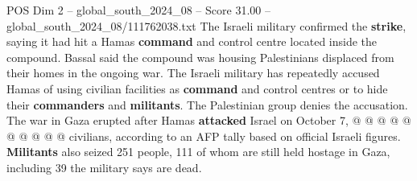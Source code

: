 \begin{textsample}{POS Dim 2 – global\_south\_2024\_08 – Score 31.00 – global\_south\_2024\_08/111762038.txt}
The Israeli military confirmed the \textbf{strike}, saying it had hit a Hamas \textbf{command} and control centre located inside the compound.
Bassal said the compound was housing Palestinians displaced from their homes in the ongoing war.
The Israeli military has repeatedly accused Hamas of using civilian facilities as \textbf{command} and control centres or to hide their \textbf{commanders} and \textbf{militants}.
The Palestinian group denies the accusation.
The war in Gaza erupted after Hamas \textbf{attacked} Israel on October 7, @ @ @ @ @ @ @ @ @ @ civilians, according to an AFP tally based on official Israeli figures. \textbf{Militants} also seized 251 people, 111 of whom are still held hostage in Gaza, including 39 the military says are dead.

\end{textsample}
